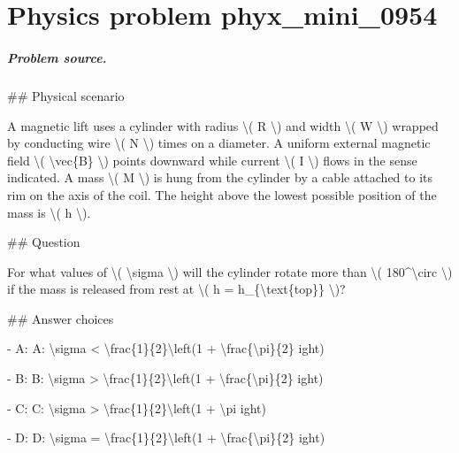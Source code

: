 
\chapter{Physics problem phyx\_mini\_0954}
\label{ch:PhyXMiniProblems_problem_phyx_mini_0954}

\paragraph{Problem source.}
\#\# Physical scenario

A magnetic lift uses a cylinder with radius \textbackslash{}( R \textbackslash{}) and width \textbackslash{}( W \textbackslash{}) wrapped by conducting wire \textbackslash{}( N \textbackslash{}) times on a diameter. A uniform external magnetic field \textbackslash{}( \textbackslash{}vec\{B\} \textbackslash{}) points downward while current \textbackslash{}( I \textbackslash{}) flows in the sense indicated. A mass \textbackslash{}( M \textbackslash{}) is hung from the cylinder by a cable attached to its rim on the axis of the coil. The height above the lowest possible position of the mass is \textbackslash{}( h \textbackslash{}).

\#\# Question

For what values of \textbackslash{}( \textbackslash{}sigma \textbackslash{}) will the cylinder rotate more than \textbackslash{}( 180\textasciicircum{}\textbackslash{}circ \textbackslash{}) if the mass is released from rest at \textbackslash{}( h = h\_\{\textbackslash{}text\{top\}\} \textbackslash{})?

\#\# Answer choices

- A: A: \textbackslash{}sigma < \textbackslash{}frac\{1\}\{2\}\textbackslash{}left(1 + \textbackslash{}frac\{\textbackslash{}pi\}\{2\}
ight)

- B: B: \textbackslash{}sigma > \textbackslash{}frac\{1\}\{2\}\textbackslash{}left(1 + \textbackslash{}frac\{\textbackslash{}pi\}\{2\}
ight)

- C: C: \textbackslash{}sigma > \textbackslash{}frac\{1\}\{2\}\textbackslash{}left(1 + \textbackslash{}pi
ight)

- D: D: \textbackslash{}sigma = \textbackslash{}frac\{1\}\{2\}\textbackslash{}left(1 + \textbackslash{}frac\{\textbackslash{}pi\}\{2\}
ight)

